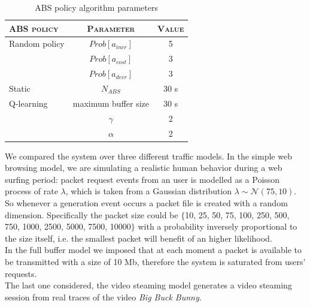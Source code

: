 \documentclass[conference,10pt]{IEEEtran}
\begin{document}
\bgroup
\def\arraystretch{1.2}%
\begin{footnotesize}
	\begin{table}[!htb]
		\centering
		\vspace{10pt}
		\caption{ABS policy algorithm parameters}\label{table:a}
		\begin{tabular}{lcc} 
			\hline
			\multicolumn{1}{l|}{\scshape ABS policy} & \multicolumn{1}{c}{\scshape Parameter}   	& \scshape Value    \\ \hline
			\multicolumn{1}{l|}{Random policy}       & \multicolumn{1}{c|}{$Prob[a_{incr}]$} 		& 5                 \\ 
			\multicolumn{1}{l|}{}                   	& \multicolumn{1}{c|}{$Prob[a_{cost}]$} 			& 3\\
			\multicolumn{1}{l|}{}                   	& \multicolumn{1}{c|}{$Prob[a_{decr}]$} 		& 3       \\ \hline
			\multicolumn{1}{l|}{Static}				& \multicolumn{1}{c|}{$N_{ABS}$} 	 			& 30 s		     \\  \hline    
			\multicolumn{1}{l|}{Q-learning}			& \multicolumn{1}{c|}{maximum buffer size} 	 & 30 s		     \\   
			\multicolumn{1}{l|}{}                   	& \multicolumn{1}{c|}{$\gamma$}                  & 2                 \\ 
			\multicolumn{1}{l|}{}                   	& \multicolumn{1}{c|}{$\alpha$}                  & 2                 \\              
		\end{tabular}
	\end{table}
\end{footnotesize}
\egroup

\noindent We compared the system over three different traffic models. In the simple web browsing model, we are simulating a realistic human behavior during a web surfing period: packet request events from an user is modelled as a Poisson process of rate $\lambda$, which is taken from a Gaussian distribution $\lambda\sim\mathcal{N}(75, 10)$. So whenever a generation event occurs a packet file is created with a random dimension. Specifically the packet size could be $\lbrace$10, 25, 50, 75, 100, 250, 500, 750, 1000, 2500, 5000, 7500, 10000$\rbrace$ with a probability inversely proportional to the size itself, i.e. the smallest packet will benefit of an higher likelihood.\\
In the full buffer model we imposed that at each moment a packet is available to be transmitted with a size of 10 Mb, therefore the system is saturated from users' requests.\\
The last one considered, the video steaming model generates a video steaming session from real traces of the video \textit{Big Buck Bunny}.
\end{document}
